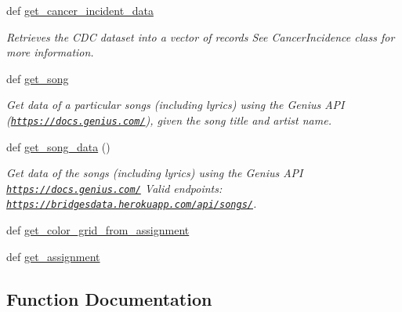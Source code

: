 \begin{DoxyCompactItemize}
def \hyperlink{namespace_bridges_1_1data__src__dependent_1_1data__source_a4e7734a7fd4f7aa80c626e9c9aefaaea}{get\+\_\+cancer\+\_\+incident\+\_\+data}
\begin{DoxyCompactList}\small\item\em Retrieves the C\+D\+C dataset into a vector of records See Cancer\+Incidence class for more information. \end{DoxyCompactList}\item 
def \hyperlink{namespace_bridges_1_1data__src__dependent_1_1data__source_ac21d02f0bcee4b26d701d5bd3220ecf6}{get\+\_\+song}
\begin{DoxyCompactList}\small\item\em Get data of a particular songs (including lyrics) using the Genius A\+P\+I (\href{https://docs.genius.com/}{\tt https\+://docs.\+genius.\+com/}), given the song title and artist name. \end{DoxyCompactList}\item 
def \hyperlink{namespace_bridges_1_1data__src__dependent_1_1data__source_af5f6d4a89696c75207cee8976de0fddd}{get\+\_\+song\+\_\+data} ()
\begin{DoxyCompactList}\small\item\em Get data of the songs (including lyrics) using the Genius A\+P\+I \href{https://docs.genius.com/}{\tt https\+://docs.\+genius.\+com/} Valid endpoints\+: \href{https://bridgesdata.herokuapp.com/api/songs/}{\tt https\+://bridgesdata.\+herokuapp.\+com/api/songs/}. \end{DoxyCompactList}\item 
def \hyperlink{namespace_bridges_1_1data__src__dependent_1_1data__source_a1a851dfdce5898af7dcd232cce65bcff}{get\+\_\+color\+\_\+grid\+\_\+from\+\_\+assignment}
\item 
def \hyperlink{namespace_bridges_1_1data__src__dependent_1_1data__source_a0ecae0915045e16e8567e19b1e82f7f3}{get\+\_\+assignment}
\end{DoxyCompactItemize}


\subsection{Function Documentation}
\hypertarget{namespace_bridges_1_1data__src__dependent_1_1data__source_a3b6caaad858f1cb5504f54692faae3d0}{}
